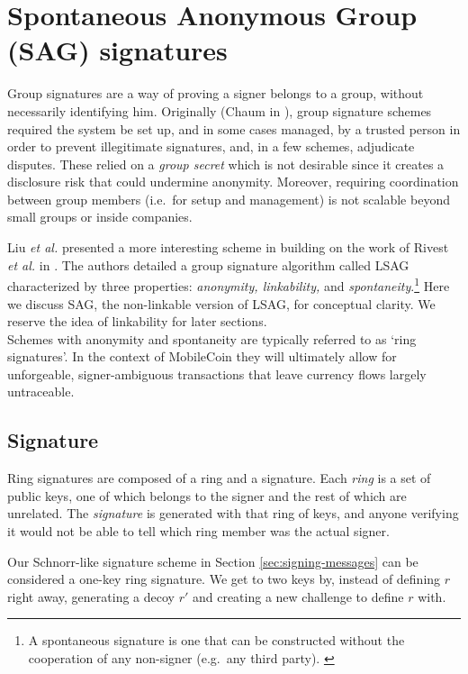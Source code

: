 \section{Spontaneous Anonymous Group (SAG) signatures}
\label{SAG_section}

Group signatures are a way of proving a signer belongs to a group, without necessarily identifying him. Originally (Chaum in \cite{Chaum:1991:GS:1754868.1754897}), group signature schemes required the system be set up, and in some cases managed, by a trusted person in order to prevent illegitimate signatures, and, in a few schemes, adjudicate disputes. These relied on a {\em group secret} which is not desirable since it creates a disclosure risk that could undermine anonymity. Moreover, requiring coordination between group members (i.e.\ for setup and management) is not scalable beyond small groups or inside companies.

Liu {\em et al.} presented a more interesting scheme in \cite{Liu2004} building on the work of Rivest {\em et al.} in \cite{rivest-leak-secret}. The authors detailed a group signature algorithm called LSAG characterized by three properties: {\em anonymity, linkability,} and {\em spontaneity}.\footnote{A spontaneous signature is one that can be constructed without the cooperation of any non-signer (e.g.\ any third party). \cite{Liu2004}} Here we discuss SAG, the non-linkable version of LSAG, for conceptual clarity. We reserve the idea of linkability for later sections.
\\

Schemes with anonymity and spontaneity are typically referred to as `ring signatures'. In the context of MobileCoin they will ultimately allow for unforgeable, signer-ambiguous transactions that leave currency flows largely untraceable.


\subsection*{Signature}

Ring signatures are composed of a ring and a signature. Each {\em ring} is a set of public keys, one of which belongs to the signer and the rest of which are unrelated. The {\em signature} is generated with that ring of keys, and anyone verifying it would not be able to tell which ring member was the actual signer.

Our Schnorr-like signature scheme in Section \ref{sec:signing-messages} can be considered a one-key ring signature. We get to two keys by, instead of defining $r$ right away, generating a decoy $r'$ and creating a new challenge to define $r$ with.
\\

